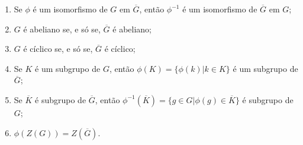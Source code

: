 	\begin{theorem}
		\label{isomorfismos em grupos}
		\begin{enumerate}
			\item Se $\phi$ é um isomorfismo de $G$ em $\overline{G}$, então $\phi ^{-1}$ é um isomorfismo de $\overline{G}$ em $G$;
			\item $G$ é abeliano se, e só se, $\overline{G}$ é abeliano;
			\item $G$ é cíclico se, e só se, $\overline{G}$ é cíclico;
			\item Se $K$ é um subgrupo de $G$, então $\phi(K) = \{\phi(k)|k\in K\}$ é um subgrupo de $\overline{G}$;
			\item Se $\overline{K}$ é subgrupo de $\overline{G}$, então $\phi^{-1}(\overline{K}) = \{ g\in G|\phi(g)\in\overline{K}\}$ é subgrupo de $G$;
			\item $\phi(Z(G)) = Z(\overline{G})$.
		\end{enumerate}	
	\end{theorem}
